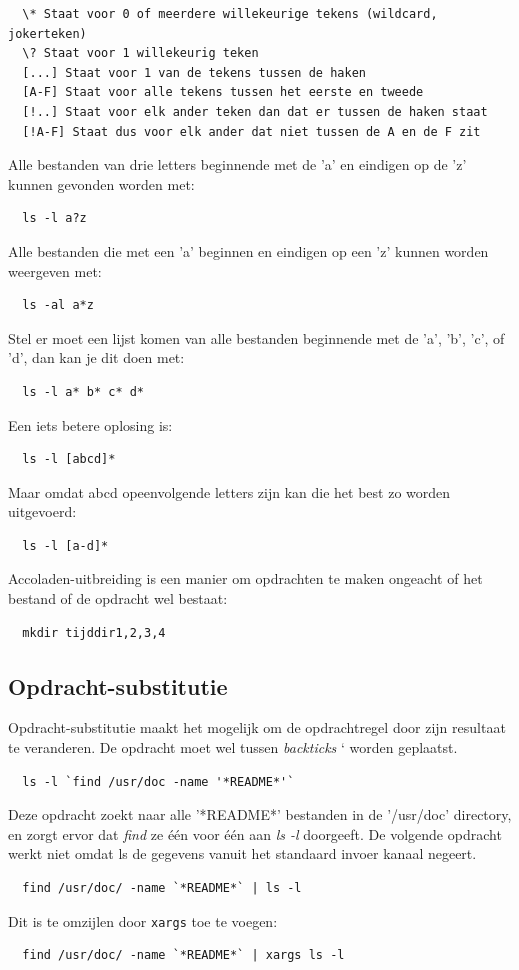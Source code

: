 \begin{lstlisting}
  \* Staat voor 0 of meerdere willekeurige tekens (wildcard, jokerteken)
  \? Staat voor 1 willekeurig teken
  [...] Staat voor 1 van de tekens tussen de haken
  [A-F] Staat voor alle tekens tussen het eerste en tweede
  [!..] Staat voor elk ander teken dan dat er tussen de haken staat
  [!A-F] Staat dus voor elk ander dat niet tussen de A en de F zit
\end{lstlisting}
Alle bestanden van drie letters beginnende met de 'a' en eindigen op de 'z' kunnen gevonden worden met:
\begin{lstlisting}
  ls -l a?z
\end{lstlisting}
Alle bestanden die met een 'a' beginnen en eindigen op een 'z' kunnen worden weergeven met:
\begin{lstlisting}
  ls -al a*z
\end{lstlisting}
Stel er moet een lijst komen van alle bestanden beginnende met de 'a', 'b', 'c', of 'd', dan kan je dit doen met:
\begin{lstlisting}
  ls -l a* b* c* d*
\end{lstlisting}
Een iets betere oplosing is:
\begin{lstlisting}
  ls -l [abcd]*
\end{lstlisting}
Maar omdat abcd opeenvolgende letters zijn kan die het best zo worden uitgevoerd:
\begin{lstlisting}
  ls -l [a-d]*
\end{lstlisting}
Accoladen-uitbreiding is een manier om opdrachten te maken ongeacht of het bestand of de opdracht wel bestaat:
\begin{lstlisting}
  mkdir tijddir1,2,3,4
\end{lstlisting}

\subsection{Opdracht-substitutie}
Opdracht-substitutie maakt het mogelijk om de opdrachtregel door zijn resultaat te veranderen. De opdracht moet wel tussen \emph{backticks} ` worden geplaatst. 
\begin{lstlisting}
  ls -l `find /usr/doc -name '*README*'`
\end{lstlisting}
Deze opdracht zoekt naar alle '*README*' bestanden in de '/usr/doc' directory, en zorgt ervor dat \emph{find} ze \'{e}\'{e}n voor \'{e}\'{e}n aan \emph{ls -l} doorgeeft. De volgende opdracht werkt niet omdat ls de gegevens vanuit het standaard invoer kanaal negeert.
\begin{lstlisting}
  find /usr/doc/ -name `*README*` | ls -l
\end{lstlisting}
Dit is te omzijlen door \texttt{xargs} toe te voegen:
\begin{lstlisting}
  find /usr/doc/ -name `*README*` | xargs ls -l
\end{lstlisting}

